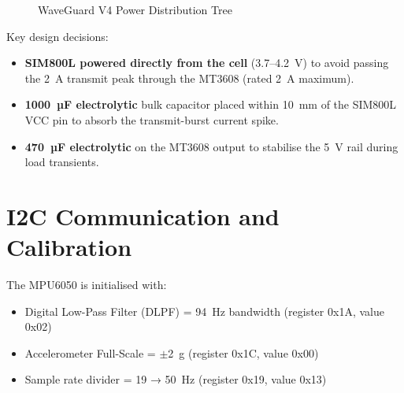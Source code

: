 \begin{figure}[H]
\centering
{}
\caption{WaveGuard V4 Power Distribution Tree}
\label{fig:power}
\end{figure}

\noindent Key design decisions:
\begin{itemize}
  \item \textbf{SIM800L powered directly from the cell} (3.7--4.2~V) to avoid passing
        the 2~A transmit peak through the MT3608 (rated 2~A maximum).
  \item \textbf{1000~µF electrolytic} bulk capacitor placed within 10~mm of the
        SIM800L VCC pin to absorb the transmit-burst current spike.
  \item \textbf{470~µF electrolytic} on the MT3608 output to stabilise the 5~V rail
        during load transients.
\end{itemize}

\section{I2C Communication and Calibration}

The MPU6050 is initialised with:
\begin{itemize}
  \item Digital Low-Pass Filter (DLPF) = 94~Hz bandwidth (register 0x1A, value 0x02)
  \item Accelerometer Full-Scale = $\pm$2~g (register 0x1C, value 0x00)
  \item Sample rate divider = 19 → 50~Hz (register 0x19, value 0x13)
\end{itemize}

